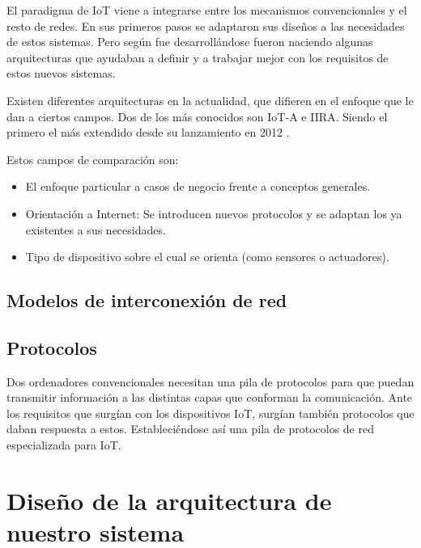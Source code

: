 \documentclass[a4paper,10pt]{article}
\begin{document}
El paradigma de IoT viene a integrarse entre los mecanismos
convencionales y el resto de redes. En sus primeros pasos se adaptaron
sus diseños a las necesidades de estos sistemas. Pero según fue
desarrollándose fueron naciendo algunas arquitecturas que ayudaban a
definir y a trabajar mejor con los requisitos de estos nuevos sistemas.

Existen diferentes arquitecturas en la actualidad, que difieren en el
enfoque que le dan a ciertos campos. Dos de los más conocidos son IoT-A
e IIRA. Siendo el primero el más extendido desde su lanzamiento en 2012
\href{https://web.archive.org/web/20191116195145/https://www.researchgate.net/publication/288855901_Reference_Architectures_for_the_Internet_of_Things}{}.

Estos campos de comparación
son:\href{https://web.archive.org/web/20191116203648/https://www.sciencedirect.com/science/article/abs/pii/S1389128610001568?via=ihub}{}

\begin{itemize}
\item
  El enfoque particular a casos de negocio frente a conceptos generales.
\item
  Orientación a Internet: Se introducen nuevos protocolos y se adaptan
  los ya existentes a sus necesidades.
\item
  Tipo de dispositivo sobre el cual se orienta (como sensores o
  actuadores).
\end{itemize}

\subsection{Modelos de interconexión de
red}\label{modelos-de-interconexiuxf3n-de-red}

\subsection{Protocolos}\label{protocolos}

Dos ordenadores convencionales necesitan una pila de protocolos para que
puedan transmitir información a las distintas capas que conforman la
comunicación. Ante los requisitos que surgían con los dispositivos IoT,
surgían también protocolos que daban respuesta a estos. Estableciéndose
así una pila de protocolos de red especializada para IoT.

\section{Diseño de la arquitectura de nuestro
sistema}\label{diseuxf1o-de-la-arquitectura-de-nuestro-sistema}
\end{document}
